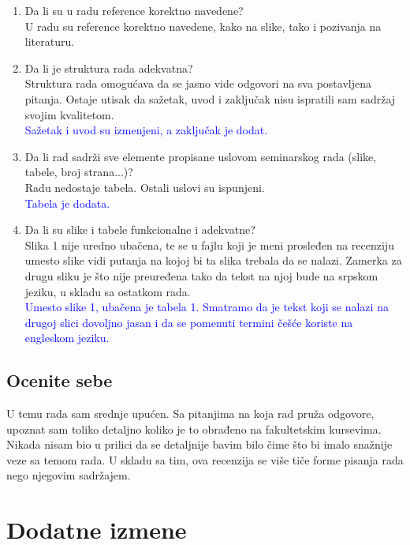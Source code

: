 \documentclass[a4paper]{report}
\newcommand{\odgovor}[1]{\textcolor{blue}{#1}}
\begin{document}
\begin{enumerate}
\item Da li su u radu reference korektno navedene?\\
{U radu su reference korektno navedene, kako na slike, tako i pozivanja na literaturu.}
\item Da li je struktura rada adekvatna?\\
{Struktura rada omogućava da se jasno vide odgovori na sva postavljena pitanja. Ostaje utisak da sažetak, uvod i zaključak nisu ispratili sam sadržaj svojim kvalitetom.}\\
\odgovor{Sažetak i uvod su izmenjeni, a zaključak je dodat.}
\item Da li rad sadrži sve elemente propisane uslovom seminarskog rada (slike, tabele, broj strana...)?\\
{Radu nedostaje tabela. Ostali uslovi su ispunjeni.}\\
\odgovor{Tabela je dodata.}
\item Da li su slike i tabele funkcionalne i adekvatne?\\
{Slika 1 nije uredno ubačena, te se u fajlu koji je meni prosleđen na recenziju umesto slike vidi putanja na kojoj bi ta slika trebala da se nalazi. Zamerka za drugu sliku je što nije preuređena tako da tekst na njoj bude na srpskom jeziku, u skladu sa ostatkom rada.}\\
\odgovor{Umesto slike 1, ubačena je tabela 1. Smatramo da je tekst koji se nalazi na drugoj slici dovoljno jasan i da se pomenuti termini češće koriste na engleskom jeziku.}
\end{enumerate}

\section{Ocenite sebe}

U temu rada sam srednje upućen. Sa pitanjima na koja rad pruža odgovore, upoznat sam toliko detaljno koliko je to obrađeno na fakultetskim kursevima. Nikada nisam bio u prilici da se detaljnije bavim bilo čime što bi imalo snažnije veze sa temom rada. U skladu sa tim, ova recenzija se više tiče forme pisanja rada nego njegovim sadržajem.

\chapter{Dodatne izmene}
\end{document}
